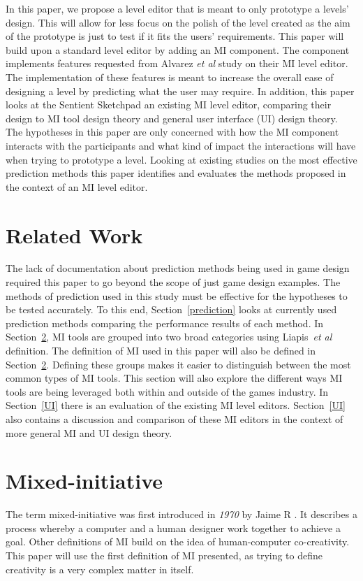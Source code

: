 \documentclass[journal]{IEEEtran}
\begin{document}
In this paper, we propose a level editor that is meant to only prototype a levels' design. This will allow for less focus on the polish of the level created as the aim of the prototype is just to test if it fits the users' requirements. This paper will build upon a standard level editor by adding an MI component. The component implements features requested from Alvarez \textit{et al}\cite{alvarez2018fostering} study on their MI level editor. The implementation of these features is meant to increase the overall ease of designing a level by predicting what the user may require. In addition, this paper looks at the Sentient Sketchpad\cite{liapis2013sentient} an existing MI level editor, comparing their design to MI tool design theory and general user interface (UI) design theory. The hypotheses in this paper are only concerned with how the MI component interacts with the participants and what kind of impact the interactions will have when trying to prototype a level. Looking at existing studies on the most effective prediction methods \cite{shepperd2001comparing,mendes2002further, wen2012systematic} this paper identifies and evaluates the methods proposed in the context of an MI level editor.

\section{Related Work}
The lack of documentation about prediction methods being used in game design required this paper to go beyond the scope of just game design examples. The methods of prediction used in this study must be effective for the hypotheses to be tested accurately. To this end, Section~\ref{prediction} looks at currently used prediction methods comparing the performance results of each method. In Section~\ref{MI}, MI tools are grouped into two broad categories using Liapis~\textit{et al}\cite{liapis2016mixed} definition. The definition of MI used in this paper will also be defined in Section~\ref{MI}. Defining these groups makes it easier to distinguish between the most common types of MI tools. This section will also explore the different ways MI tools are being leveraged both within and outside of the games industry. In Section~\ref{UI} there is an evaluation of the existing MI level editors. Section~\ref{UI} also contains a discussion and comparison of these MI editors in the context of more general MI and UI design theory.

\section{Mixed-initiative} \label{MI}
The term mixed-initiative was first introduced in \textit{1970} by Jaime R \cite{carbonell1970mixed}.
It describes a process whereby a computer and a human designer work together to achieve a goal. Other definitions of MI build on the idea of human-computer co-creativity. This paper will use the first definition of MI presented, as trying to define creativity is a very complex matter in itself. 
\end{document}
